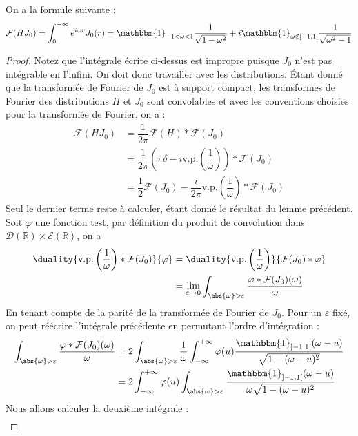 \documentclass[11pt,a4paper]{article}
\begin{document}
\begin{Lem} On a la formule suivante : 
\[ \mathcal{F}(H  J_0) = \int_{0}^{+\infty} e^{i\omega r} J_0(r) = \mathbbm{1}_{-1<\omega<1}\dfrac{1}{\sqrt{1-\omega^2}} + i \mathbbm{1}_{\omega \notin ]-1,1[}\dfrac{1}{\sqrt{\omega^2-1}} \]
\begin{proof}
Notez que l'intégrale écrite ci-dessus est impropre puisque $J_0$ n'est pas intégrable en l'infini. On doit donc travailler avec les distributions. Étant donné que la transformée de Fourier de $J_0$ est à support compact, les transformes de Fourier des distributions $H$ et $J_0$ sont convolables et avec les conventions choisies pour la transformée de Fourier, on a :
\begin{align*}
\mathcal{F}(HJ_0) &= \dfrac{1}{2\pi}\mathcal{F}(H)*\mathcal{F}(J_0)\\
& = \dfrac{1}{2\pi}\left(\pi \delta - i \text{v.p.}\left(\dfrac{1}{\omega}\right)\right)*\mathcal{F}(J_0)\\
& = \dfrac{1}{2} \mathcal{F}(J_0) - \dfrac{i}{2\pi} \text{v.p.}\left(\dfrac{1}{\omega}\right)*\mathcal{F}(J_0)
\end{align*}
Seul le dernier terme reste à calculer, étant donné le résultat du lemme précédent. Soit $\varphi$ une fonction test, par définition du produit de convolution dans $\mathcal{D}(\mathbb{R})\times \mathcal{E}(\mathbb{R})$, on a 
\begin{align*}
\duality{\text{v.p.}\left(\dfrac{1}{\omega}\right)*\mathcal{F}(J_0)}{\varphi} &= \duality{\text{v.p.}\left(\dfrac{1}{\omega}\right)}{\mathcal{F}(J_0)*\varphi} \\
& = \lim_{\varepsilon\to0} \int_{\abs{\omega}> \varepsilon} \dfrac{\varphi * \mathcal{F}(J_0)(\omega)}{\omega}
\end{align*} 
En tenant compte de la parité de la transformée de Fourier de $J_0$. Pour un $\varepsilon$ fixé, on peut réécrire l'intégrale précédente en permutant l'ordre d'intégration : 
\begin{align*}
\int_{\abs{\omega}> \varepsilon} \dfrac{\varphi * \mathcal{F}(J_0)(\omega)}{\omega} &= 2\int_{\abs{\omega}> \varepsilon} \dfrac{1}{\omega} \int_{-\infty}^{+\infty} \varphi(u)\dfrac{\mathbbm{1}_{]-1,1[}(\omega-u)}{\sqrt{1-(\omega-u)^2}}\\
& = 2 \int_{-\infty}^{+\infty} \varphi(u) \int_{\abs{\omega}> \varepsilon} \dfrac{\mathbbm{1}_{]-1,1[}(\omega-u)}{\omega\sqrt{1-(\omega-u)^2}}
\end{align*}
Nous allons calculer la deuxième intégrale : 
\begin{align*}

\end{align*}
\end{proof}
\end{Lem}
\end{document}
